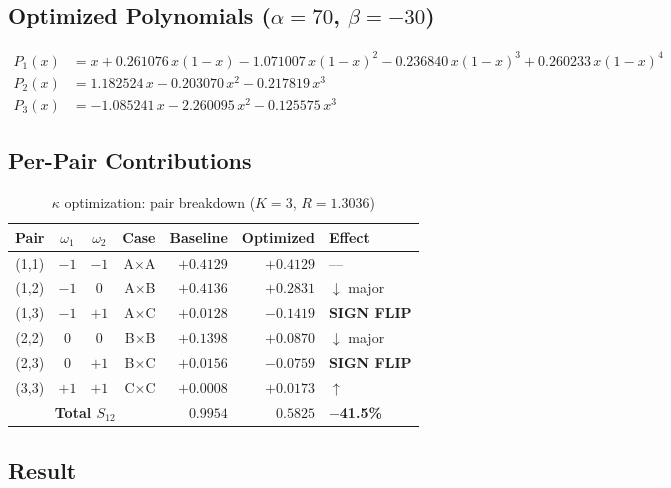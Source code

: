 \documentclass[11pt]{article}
\begin{document}
\subsection{Optimized Polynomials ($\alpha=70$, $\beta=-30$)}

\begin{align*}
P_1(x) &= x + 0.261076\, x(1-x) - 1.071007\, x(1-x)^2 - 0.236840\, x(1-x)^3 + 0.260233\, x(1-x)^4 \\[1ex]
P_2(x) &= 1.182524\, x -0.203070\, x^2 -0.217819\, x^3 \\[1ex]
P_3(x) &= -1.085241\, x -2.260095\, x^2 -0.125575\, x^3
\end{align*}

\subsection{Per-Pair Contributions}

\begin{table}[h]
\centering
\caption{$\kappa$ optimization: pair breakdown ($K=3$, $R=1.3036$)}
\begin{tabular}{cccrrrl}
\toprule
Pair & $\omega_1$ & $\omega_2$ & Case & Baseline & Optimized & Effect \\
\midrule
(1,1) & $-1$ & $-1$ & A$\times$A & $+0.4129$ & $+0.4129$ & --- \\
(1,2) & $-1$ & $0$ & A$\times$B & $+0.4136$ & $+0.2831$ & $\downarrow$ major \\
(1,3) & $-1$ & $+1$ & A$\times$C & $+0.0128$ & \textcolor{signflip}{$\mathbf{-0.1419}$} & \textcolor{signflip}{\textbf{SIGN FLIP}} \\
(2,2) & $0$ & $0$ & B$\times$B & $+0.1398$ & $+0.0870$ & $\downarrow$ major \\
(2,3) & $0$ & $+1$ & B$\times$C & $+0.0156$ & \textcolor{signflip}{$\mathbf{-0.0759}$} & \textcolor{signflip}{\textbf{SIGN FLIP}} \\
(3,3) & $+1$ & $+1$ & C$\times$C & $+0.0008$ & $+0.0173$ & $\uparrow$ \\
\midrule
\multicolumn{4}{c}{\textbf{Total $S_{12}$}} & $0.9954$ & $0.5825$ & \textbf{$-$41.5\%} \\
\bottomrule
\end{tabular}
\end{table}

\subsection{Result}
\end{document}
